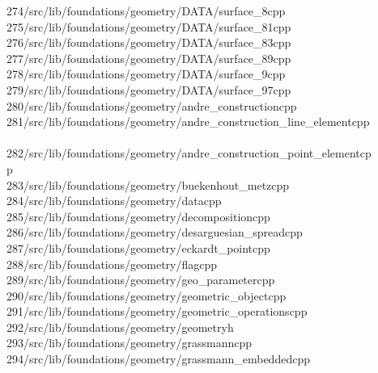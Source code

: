 \begin{tabbing}
274\>/src/lib/foundations/geometry/DATA/surface\_8cpp\\[0pt]
275\>/src/lib/foundations/geometry/DATA/surface\_81cpp\\[0pt]
276\>/src/lib/foundations/geometry/DATA/surface\_83cpp\\[0pt]
277\>/src/lib/foundations/geometry/DATA/surface\_89cpp\\[0pt]
278\>/src/lib/foundations/geometry/DATA/surface\_9cpp\\[0pt]
279\>/src/lib/foundations/geometry/DATA/surface\_97cpp\\[0pt]
280\>/src/lib/foundations/geometry/andre\_constructioncpp\\[0pt]
281\>/src/lib/foundations/geometry/andre\_construction\_line\_elementcpp\\[0pt]
\>\\[0pt]
282\>/src/lib/foundations/geometry/andre\_construction\_point\_elementcp\\[0pt]
\>p\\[0pt]
283\>/src/lib/foundations/geometry/buekenhout\_metzcpp\\[0pt]
284\>/src/lib/foundations/geometry/datacpp\\[0pt]
285\>/src/lib/foundations/geometry/decompositioncpp\\[0pt]
286\>/src/lib/foundations/geometry/desarguesian\_spreadcpp\\[0pt]
287\>/src/lib/foundations/geometry/eckardt\_pointcpp\\[0pt]
288\>/src/lib/foundations/geometry/flagcpp\\[0pt]
289\>/src/lib/foundations/geometry/geo\_parametercpp\\[0pt]
290\>/src/lib/foundations/geometry/geometric\_objectcpp\\[0pt]
291\>/src/lib/foundations/geometry/geometric\_operationscpp\\[0pt]
292\>/src/lib/foundations/geometry/geometryh\\[0pt]
293\>/src/lib/foundations/geometry/grassmanncpp\\[0pt]
294\>/src/lib/foundations/geometry/grassmann\_embeddedcpp\\[0pt]

\end{tabbing}
